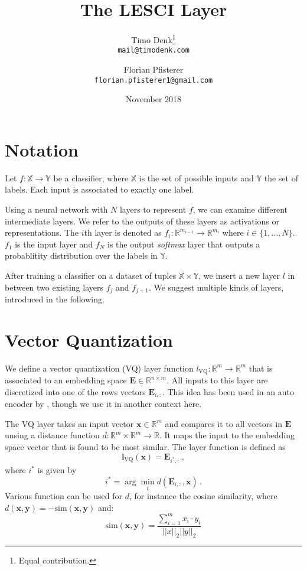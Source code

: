 \documentclass{article}
\title{The LESCI Layer}
\author{
  Timo  Denk\thanks{Equal contribution.}\\
  \texttt{mail@timodenk.com}
  \and
  Florian Pfisterer\footnotemark[1]\\
  \texttt{florian.pfisterer1@gmail.com}
}
\date{November 2018}
\begin{document}
\maketitle

\section{Notation}

Let $f:\mathbb{X}\rightarrow\mathbb{Y}$ be a classifier, where $\mathbb{X}$ is the set of possible inputs and $\mathbb{Y}$ the set of labels. Each input is associated to exactly one label. 

Using a neural network with $N$ layers to represent $f$, we can examine different intermediate layers.
We refer to the outputs of these layers as activations or representations.
The $i$th layer is denoted as $f_i: \mathbb{R}^{m_{i-1}} \rightarrow \mathbb{R}^{m_{i}}$ where $i \in \{1,\ldots,N\}$.
$f_1$ is the input layer and $f_N$ is the output \textit{softmax} layer that outputs a probablitity distribution over the labels in $\mathbb{Y}.$

After training a classifier on a dataset of tuples $\mathbb{X}\times\mathbb{Y}$, we insert a new layer $l$ in between two existing layers $f_j$ and $f_{j+1}$. We suggest multiple kinds of layers, introduced in the following.

\section{Vector Quantization}

We define a vector quantization (VQ) layer function $l_\text{VQ}:\mathbb{R}^m\rightarrow\mathbb{R}^m$ that is associated to an embedding space $\bm{E}\in\mathbb{R}^{n\times m}$.
All inputs to this layer are discretized into one of the rows vectors $\bm{E}_{i,:}$.
This idea has been used in an auto encoder by \cite{vq-vae}, though we use it in another context here.

The VQ layer takes an input vector $\bm{x}\in\mathbb{R}^m$ and compares it to all vectors in $\bm{E}$ unsing a distance function $d:\mathbb{R}^{m}\times\mathbb{R}^{m}\rightarrow\mathbb{R}$.
It maps the input to the embedding space vector that is found to be most similar. The layer function is defined as
\begin{equation}
    \bm{l}_\text{VQ}\left(\bm{x}\right)=\bm{E}_{i^*,:}\,,
\end{equation}
where $i^*$ is given by
\begin{equation}
    i^*=\arg\min_i d\left(\bm{E}_{i,:},\bm{x}\right)\,.
    \label{vq-argmin}
\end{equation}
Various function can be used for $d$, for instance the cosine similarity, where $d(\bm{x}, \bm{y})=-\text{sim}(\bm{x}, \bm{y})$ and:
\begin{equation}
    \text{sim}(\bm{x}, \bm{y}) = \frac{\sum^m_{i=1} x_i\cdot y_i}{||x||_2 ||y||_2}
    \label{cos-sim}
\end{equation}
\end{document}
